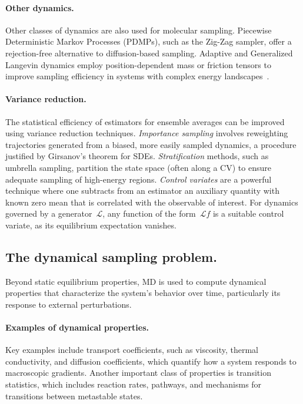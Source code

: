 \paragraph{Other dynamics.} Other classes of dynamics are also used for molecular sampling. Piecewise Deterministic Markov Processes (PDMPs), such as the Zig-Zag sampler, offer a rejection-free alternative to diffusion-based sampling. Adaptive and Generalized Langevin dynamics employ position-dependent mass or friction tensors to improve sampling efficiency in systems with complex energy landscapes~\cite{BLS25a}.

\paragraph{Variance reduction.} The statistical efficiency of estimators for ensemble averages can be improved using variance reduction techniques. \textit{Importance sampling} involves reweighting trajectories generated from a biased, more easily sampled dynamics, a procedure justified by Girsanov's theorem for SDEs. \textit{Stratification} methods, such as umbrella sampling, partition the state space (often along a CV) to ensure adequate sampling of high-energy regions. \textit{Control variates} are a powerful technique where one subtracts from an estimator an auxiliary quantity with known zero mean that is correlated with the observable of interest. For dynamics governed by a generator~$\mathcal{L}$, any function of the form~$\mathcal{L}f$ is a suitable control variate, as its equilibrium expectation vanishes.

\subsection{The dynamical sampling problem.}
\label{sec:01:dynamical_properties}
Beyond static equilibrium properties, MD is used to compute dynamical properties that characterize the system's behavior over time, particularly its response to external perturbations.

\paragraph{Examples of dynamical properties.} Key examples include transport coefficients, such as viscosity, thermal conductivity, and diffusion coefficients, which quantify how a system responds to macroscopic gradients. Another important class of properties is transition statistics, which includes reaction rates, pathways, and mechanisms for transitions between metastable states.

